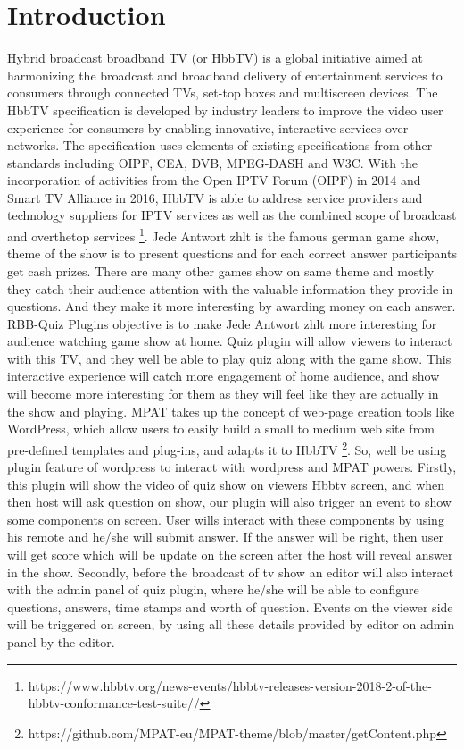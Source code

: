\section{\textbf{Introduction}}\label{sec:Introduction}
Hybrid broadcast broadband TV (or HbbTV) is a global
initiative aimed at harmonizing the broadcast and broadband
delivery of entertainment services to consumers through
connected TVs, set-top boxes and multiscreen devices. The
HbbTV specification is developed by industry leaders to improve
the video user experience for consumers by enabling innovative,
interactive services over networks. The specification
uses elements of existing specifications from other standards
including OIPF, CEA, DVB, MPEG-DASH and W3C. With
the incorporation of activities from the Open IPTV Forum
(OIPF) in 2014 and Smart TV Alliance in 2016, HbbTV is able
to address service providers and technology suppliers for IPTV
services as well as the combined scope of broadcast and overthetop services \footnote{https://www.hbbtv.org/news-events/hbbtv-releases-version-2018-2-of-the-hbbtv-conformance-test-suite//}. Jede Antwort zhlt is the famous german
game show, theme of the show is to present questions and
for each correct answer participants get cash prizes. There are many other games show on same theme and mostly they catch
their audience attention with the valuable information they
provide in questions. And they make it more interesting by
awarding money on each answer\cite{hbbtv}. RBB-Quiz Plugins objective
is to make Jede Antwort zhlt more interesting for audience
watching game show at home. Quiz plugin will allow viewers
to interact with this TV, and they well be able to play quiz
along with the game show. This interactive experience will
catch more engagement of home audience, and show will
become more interesting for them as they will feel like they are
actually in the show and playing. MPAT takes up the concept
of web-page creation tools like WordPress, which allow users
to easily build a small to medium web site from pre-defined
templates and plug-ins, and adapts it to HbbTV  \footnote{https://github.com/MPAT-eu/MPAT-theme/blob/master/getContent.php}. So, well
be using plugin feature of wordpress to interact with wordpress
and MPAT powers. Firstly, this plugin will show the video of
quiz show on viewers Hbbtv screen, and when then host will
ask question on show, our plugin will also trigger an event
to show some components on screen. User wills interact with
these components by using his remote and he/she will submit
answer\cite{MPAT}. If the answer will be right, then user will get score
which will be update on the screen after the host will reveal
answer in the show. Secondly, before the broadcast of tv show
an editor will also interact with the admin panel of quiz plugin,
where he/she will be able to configure questions, answers,
time stamps and worth of question. Events on the viewer side
will be triggered on screen, by using all these details provided
by editor on admin panel by the editor.